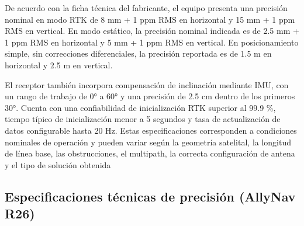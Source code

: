 \documentclass[
  letterpaper,
  DIV=11,
  numbers=noendperiod]{scrartcl}
\begin{document}
De acuerdo con la ficha técnica del fabricante, el equipo presenta una
precisión nominal en modo RTK de 8 mm + 1 ppm RMS en horizontal y 15 mm
+ 1 ppm RMS en vertical. En modo estático, la precisión nominal indicada
es de 2.5 mm + 1 ppm RMS en horizontal y 5 mm + 1 ppm RMS en vertical.
En posicionamiento simple, sin correcciones diferenciales, la precisión
reportada es de 1.5 m en horizontal y 2.5 m en vertical.

El receptor también incorpora compensación de inclinación mediante IMU,
con un rango de trabajo de 0° a 60° y una precisión de 2.5 cm dentro de
los primeros 30°. Cuenta con una confiabilidad de inicialización RTK
superior al 99.9 \%, tiempo típico de inicialización menor a 5 segundos
y tasa de actualización de datos configurable hasta 20 Hz. Estas
especificaciones corresponden a condiciones nominales de operación y
pueden variar según la geometría satelital, la longitud de línea base,
las obstrucciones, el multipath, la correcta configuración de antena y
el tipo de solución obtenida

\subsection{Especificaciones técnicas de precisión (AllyNav
R26)}\label{especificaciones-tuxe9cnicas-de-precisiuxf3n-allynav-r26}
\end{document}
